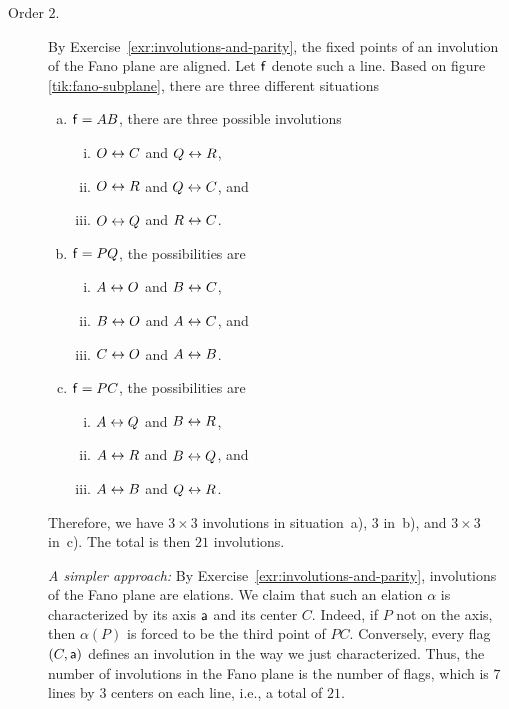 \begin{solution}
    \begin{description}
        \item[Order $2$.] By Exercise~\ref{exr:involutions-and-parity}, the fixed points of an involution of the Fano plane are aligned. Let $\mathsf f$ denote such a line. Based on figure \eqref{tik:fano-subplane}, there are three different situations
        \begin{enumerate}[a)]
            \item $\mathsf f=AB$, there are three possible involutions
            \begin{enumerate}[i)]
                \item $O\mathrel\leftrightarrow C$ and $Q\mathrel\leftrightarrow R$,
                \item $O\mathrel\leftrightarrow R$ and $Q\mathrel\leftrightarrow C$, and
                \item $O\mathrel\leftrightarrow Q$ and $R\mathrel\leftrightarrow C$.
            \end{enumerate}

            \item $\mathsf f=PQ$, the possibilities are
            \begin{enumerate}[i)]
                \item $A\mathrel\leftrightarrow O$ and $B\mathrel\leftrightarrow C$,
                \item $B\mathrel\leftrightarrow O$ and $A\mathrel\leftrightarrow C$, and
                \item $C\mathrel\leftrightarrow O$ and $A\mathrel\leftrightarrow B$.
            \end{enumerate}

            \item $\mathsf f=PC$, the possibilities are
            \begin{enumerate}[i)]
                \item $A\mathrel\leftrightarrow Q$ and $B\mathrel\leftrightarrow R$,
                \item $A\mathrel\leftrightarrow R$ and $B\mathrel\leftrightarrow Q$, and
                \item $A\mathrel\leftrightarrow B$ and $Q\mathrel\leftrightarrow R$.
            \end{enumerate}
        \end{enumerate}
        Therefore, we have $3\times3$ involutions in situation~a), $3$ in~b), and $3\times3$ in~c). The total is then $21$ involutions.
    
        \textit{A simpler approach:} By Exercise~\ref{exr:involutions-and-parity}, involutions of the Fano plane are elations. We claim that such an elation $\alpha$ is characterized by its axis $\mathsf a$ and its center $C$. Indeed, if $P$ not on the axis, then $\alpha(P)$ is forced to be the third point of $PC$. Conversely, every flag $(C,\mathsf a)$ defines an involution in the way we just characterized. Thus, the number of involutions in the Fano plane is the number of flags, which is $7$ lines by $3$ centers on each line, i.e., a total of $21$.
        

\end{description}
\end{solution}
